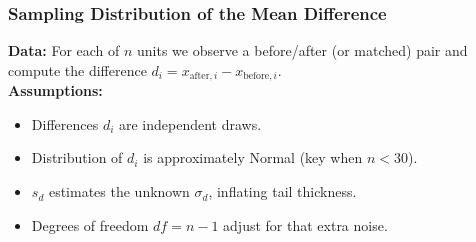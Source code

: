 \documentclass[handout]{beamer}
\begin{document}
\begin{frame}
\frametitle{Sampling Distribution of the Mean Difference}

\textbf{Data:} For each of \(n\) units we observe a before/after (or matched) pair and compute the difference \(d_i = x_{\text{after},i} - x_{\text{before},i}\).\\[0.5em]

\textbf{Assumptions:}
\begin{itemize}
  \item Differences \(d_i\) are independent draws.
  \item Distribution of \(d_i\) is approximately Normal (key when \(n<30\)).
\end{itemize}

\begin{center}
\renewcommand{\arraystretch}{2.2}
\end{center}

\begin{itemize}
  \item \(s_d\) estimates the unknown \(\sigma_d\), inflating tail thickness.
  \item Degrees of freedom \(df=n-1\) adjust for that extra noise.
\end{itemize}

\end{frame}
\end{document}
